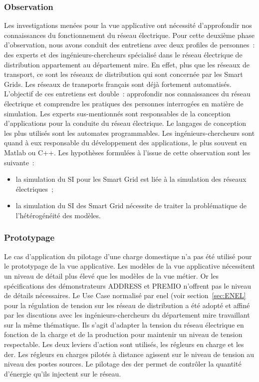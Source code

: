 				\subsubsection{Observation}
				Les investigations menées pour la vue applicative ont nécessité d'approfondir nos connaissances du fonctionnement du réseau électrique. Pour cette deuxième phase d'observation, nous avons conduit des entretiens avec deux profiles de personnes~: des experts et des ingénieurs-chercheurs spécialisé dans le réseau électrique de distribution  appartement au département \gls{mire}. En effet, plus que les réseaux de transport, ce sont les réseaux de distribution qui sont concernée par les Smart Grids. Les réseaux de transports français sont déjà fortement automatisés. 
				L'objectif de ces entretiens est double~: approfondir nos connaissances du réseau électrique et comprendre les pratiques des personnes interrogées en matière de simulation.
				Les experts sus-mentionnés sont responsables de la conception d'applications pour la conduite du réseau électrique. Le langages de conception les plus utilisés sont les automates programmables. Les ingénieurs-chercheurs sont quand à eux responsable du développement des applications, le plus souvent en Matlab ou  C++.
				Les hypothèses formulées à l'issue de cette observation sont les suivante~:
				\begin{itemize}
					\item la simulation du SI pour les Smart Grid est liée à la simulation des réseaux électriques~;
					\item la simulation du SI des Smart Grid nécessite de traiter la problématique de l'hétérogénéité des modèles.
				\end{itemize}
				
				\subsubsection{Prototypage}
				Le cas d'application du pilotage d'une charge domestique n'a pas été utilisé pour le prototypage de la vue applicative. Les modèles de la vue applicative nécessitent un niveau de détail plus élevé que les modèles de la vue métier. Or les spécifications des démonstrateurs ADDRESS et PREMIO n'offrent pas le niveau de détails nécessaires. Le Use Case normalisé par \gls{enel} (voir section~\ref{sec:ENEL} pour la régulation de tension sur les réseau de distribution a été adopté et affiné par les discutions avec les ingénieurs-chercheurs du département \gls{mire} travaillant sur la même thématique. 
				Ils s'agit d'adapter la tension du réseau électrique en fonction de la charge et de la production pour maintenir un niveau de tension respectable. Les deux leviers d'action sont utilisés, les régleurs en charge et les \gls{der}. Les régleurs en charges pilotés à distance agissent sur le niveau de tension au niveau des postes sources. Le pilotage des \gls{der} permet de contrôler la quantité d'énergie qu'ils injectent sur le réseau. 
				
